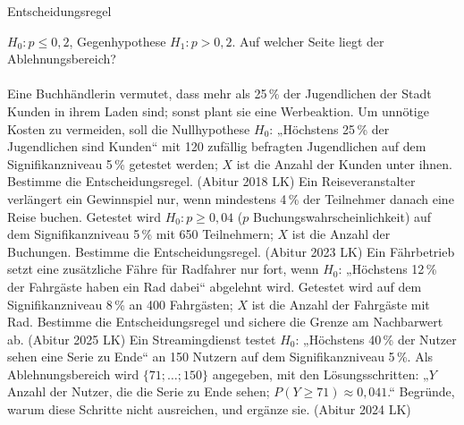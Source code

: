 \setcounter{aufgabe}{7}

\begin{aufgabe}{Entscheidungsregel}
\begin{teile}
\teil $H_0\colon p \le 0{,}2$, Gegenhypothese $H_1\colon p > 0{,}2$. Auf welcher Seite liegt der Ablehnungsbereich? \\  \\ 
\teil Eine Buchhändlerin vermutet, dass mehr als 25\,\% der Jugendlichen der Stadt Kunden in ihrem Laden sind; sonst plant sie eine Werbeaktion. Um unnötige Kosten zu vermeiden, soll die Nullhypothese $H_0$: „Höchstens 25\,\% der Jugendlichen sind Kunden“ mit 120 zufällig befragten Jugendlichen auf dem Signifikanzniveau 5\,\% getestet werden; $X$ ist die Anzahl der Kunden unter ihnen. Bestimme die Entscheidungsregel. \hfill (Abitur 2018 LK)
\teil Ein Reiseveranstalter verlängert ein Gewinnspiel nur, wenn mindestens 4\,\% der Teilnehmer danach eine Reise buchen. Getestet wird $H_0\colon p \ge 0{,}04$ ($p$ Buchungswahrscheinlichkeit) auf dem Signifikanzniveau 5\,\% mit 650 Teilnehmern; $X$ ist die Anzahl der Buchungen. Bestimme die Entscheidungsregel. \hfill (Abitur 2023 LK)
\teil Ein Fährbetrieb setzt eine zusätzliche Fähre für Radfahrer nur fort, wenn $H_0$: „Höchstens 12\,\% der Fahrgäste haben ein Rad dabei“ abgelehnt wird. Getestet wird auf dem Signifikanzniveau 8\,\% an 400 Fahrgästen; $X$ ist die Anzahl der Fahrgäste mit Rad. Bestimme die Entscheidungsregel und sichere die Grenze am Nachbarwert ab. \hfill (Abitur 2025 LK)
\teil Ein Streamingdienst testet $H_0$: „Höchstens 40\,\% der Nutzer sehen eine Serie zu Ende“ an 150 Nutzern auf dem Signifikanzniveau 5\,\%. Als Ablehnungsbereich wird $\{71; \ldots; 150\}$ angegeben, mit den Lösungsschritten: „$Y$ Anzahl der Nutzer, die die Serie zu Ende sehen; $P(Y \ge 71) \approx 0{,}041$.“ Begründe, warum diese Schritte nicht ausreichen, und ergänze sie. \hfill (Abitur 2024 LK)
\end{teile}
\end{aufgabe}


